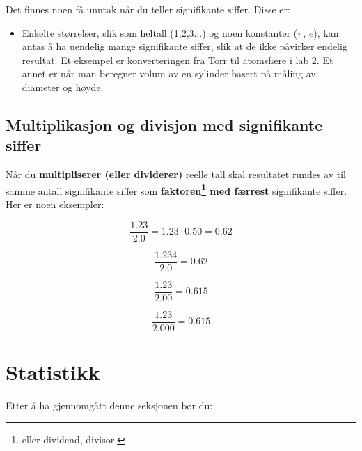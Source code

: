 \documentclass[a4paper,9pt]{article}
\begin{document}
Det finnes noen få unntak når du teller signifikante siffer. Disse er:

\begin{itemize}
\item Enkelte størrelser, slik som heltall (1,2,3...) og noen konstanter ($\pi$, $e$), kan antas å ha uendelig mange signifikante siffer, slik at de ikke påvirker endelig resultat. Et eksempel er konverteringen fra Torr til atomsfære i lab 2. Et annet er når man beregner volum av en sylinder basert på måling av diameter og høyde.
\end{itemize}

\subsection{Multiplikasjon og divisjon med signifikante siffer}

Når du \textbf{multipliserer (eller dividerer)} reelle tall skal resultatet rundes av til samme antall signifikante siffer som \textbf{faktoren\footnote{eller dividend, divisor.} med færrest} signifikante siffer. Her er noen eksempler:

\begin{equation}
\frac{1.23}{2.0} = 1.23 \cdot 0.50 = 0.62 
\end{equation}

\begin{equation}
\frac{1.234}{2.0} = 0.62
\end{equation}

\begin{equation}
\frac{1.23}{2.00} = 0.615
\end{equation}

\begin{equation}
\frac{1.23}{2.000} = 0.615
\end{equation}

\pagebreak

\section{Statistikk}


\vspace{.5cm}

Etter å ha gjennomgått denne seksjonen bør du:
\end{document}

